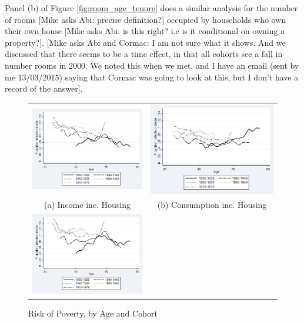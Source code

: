 Panel (b) of Figure \ref{fig:room_age_tenure} does a similar analysis for the number of rooms [Mike asks Abi: precise definition?] occupied by households who own their own house [Mike asks Abi: is this right? i.e is it conditional on owning a property?]. [Mike asks Abi and Cormac: I am not sure what it shows. And we discussed that there seems to be a time effect, in that all cohorts see a fall in number rooms in 2000. We noted this when we met, and I have an email (sent by me 13/03/2015) saying that Cormac was going to look at this, but I don't have a record of the answer].


\begin{figure}
\caption{Risk of Poverty, by Age and Cohort }
\centering
\begin{tabular}{c c}
\includegraphics[width=.5\linewidth]{pictures/cohortagerisksmooth_bhc_inc.png} &
\includegraphics[width=.5\linewidth]{pictures/cohortagerisksmooth_bhc_con.png} \\
(a) Income inc. Housing & (b) Consumption inc. Housing \\
\includegraphics[width=.5\linewidth]{pictures/cohortagerisksmooth_ahc_inc.png} &

\end{tabular}
\end{figure}
